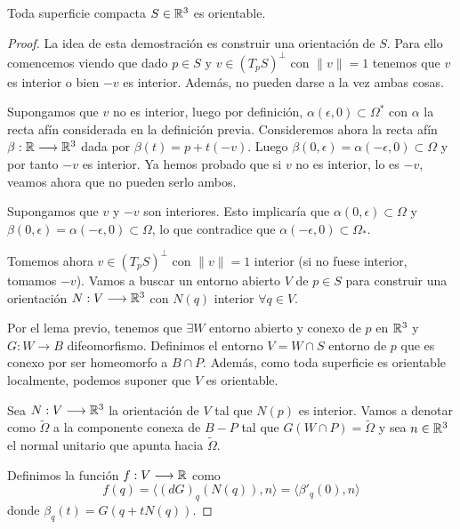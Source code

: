 \begin{theorem}\label{browersamelson}
Toda superficie compacta $S \in \mathbb{R}^3$ es orientable.
\end{theorem}
\begin{proof}
La idea de esta demostración es construir una orientación de $S$. Para ello comencemos viendo que dado $p \in S$ y $v \in (T_pS)^{\bot}$ con $\lVert v \rVert=1$ tenemos que $v$ es interior o bien $-v$ es interior. Además, no pueden darse a la vez ambas cosas.

Supongamos que $v$ no es interior, luego por definición, $\alpha(\epsilon, 0) \subset \Omega^{*}$ con $\alpha$ la recta afín considerada en la definición previa. Consideremos ahora la recta afín $\beta: \mathbb{R} \longrightarrow \mathbb{R}^3$ dada por $\beta(t)=p + t(-v)$. Luego $\beta(0, \epsilon) = \alpha(-\epsilon, 0) \subset \Omega$ y por tanto $-v$ es interior. Ya hemos probado que si $v$ no es interior, lo es $-v$, veamos ahora que no pueden serlo ambos. 

Supongamos que $v$ y $-v$ son interiores. Esto implicaría que $\alpha(0,\epsilon) \subset \Omega$ y $\beta(0, \epsilon) = \alpha(-\epsilon, 0) \subset \Omega$, lo que contradice que $\alpha(-\epsilon, 0) \subset \Omega_*$.

Tomemos ahora $v \in (T_pS)^{\bot}$ con $\lVert v \rVert=1$ interior (si no fuese interior, tomamos $-v$). Vamos a buscar un entorno abierto $V$ de $p \in S$ para construir una orientación $N: V \longrightarrow \mathbb{R}^3$ con $N(q)$ interior $\forall q \in V.$

Por el lema previo, tenemos que $\exists W$ entorno abierto y conexo de $p$ en $\mathbb{R}^3$ y $G: W \longrightarrow B$ difeomorfismo. Definimos el entorno $V=W\cap S$ entorno de $p$ que es conexo por ser homeomorfo a $B\cap P$. Además, como toda superficie es orientable localmente, podemos suponer que $V$ es orientable.

Sea $N: V \longrightarrow \mathbb{R}^3$ la orientación de $V$ tal que $N(p)$ es interior. Vamos a denotar como $\tilde{\Omega}$ a la componente conexa de $B-P$ tal que $G(W\cap P) = \tilde{\Omega}$ y sea $n \in \mathbb{R}^3$ el normal unitario que apunta hacia $\tilde{\Omega}$.

Definimos la función $f: V \longrightarrow \mathbb{R}$ como 
%
\begin{equation*}
    f(q) = \langle (dG)_q(N(q)), n \rangle = \langle \beta'_q(0), n \rangle
\end{equation*}
%
donde $\beta_q(t) = G(q + tN(q))$.


\end{proof}
